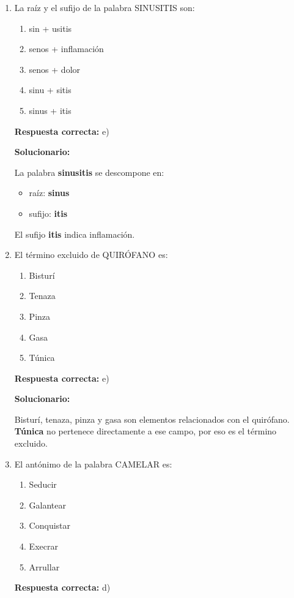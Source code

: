 \begin{enumerate}[resume]
	
	
	\item La raíz y el sufijo de la palabra SINUSITIS son:
	\begin{enumerate}[label=\alph*)]
		\item sin + usitis
		\item senos + inflamación
		\item senos + dolor
		\item sinu + sitis
		\item sinus + itis
	\end{enumerate}
	\textbf{Respuesta correcta:} e)
	
	\vspace{2mm}
	\textbf{Solucionario:}
	
	La palabra \textbf{sinusitis} se descompone en:
	\begin{itemize}
		\item raíz: \textbf{sinus}
		\item sufijo: \textbf{itis}
	\end{itemize}
	
	El sufijo \textbf{itis} indica inflamación.
	
	\vspace{6mm}
	
	\item El término excluido de QUIRÓFANO es:
	\begin{enumerate}[label=\alph*)]
		\item Bisturí
		\item Tenaza
		\item Pinza
		\item Gasa
		\item Túnica
	\end{enumerate}
	\textbf{Respuesta correcta:} e)
	
	\vspace{2mm}
	\textbf{Solucionario:}
	
	Bisturí, tenaza, pinza y gasa son elementos relacionados con el quirófano.  
	\textbf{Túnica} no pertenece directamente a ese campo, por eso es el término excluido.
	
	\vspace{6mm}
	
	\item El antónimo de la palabra CAMELAR es:
	\begin{enumerate}[label=\alph*)]
		\item Seducir
		\item Galantear
		\item Conquistar
		\item Execrar
		\item Arrullar
	\end{enumerate}
	\textbf{Respuesta correcta:} d)
	

\end{enumerate}

